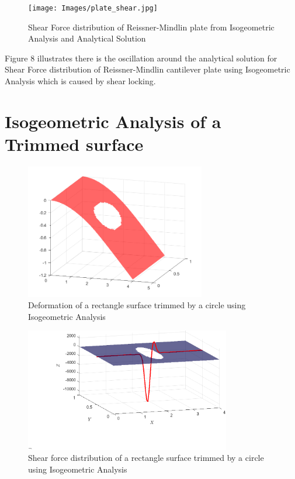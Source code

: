 \documentclass[12pt, a4paper]{report}
\begin{document}
\begin{figure}[H]
\centering
\texttt{[image: Images/plate\_shear.jpg]}
\caption{Shear Force distribution of Reissner-Mindlin plate from Isogeometric Analysis and Analytical Solution}
\label{fig:RM}
\end{figure}

Figure 8 illustrates there is the oscillation around the analytical solution for Shear Force distribution of Reissner-Mindlin cantilever plate using Isogeometric Analysis which is caused by shear locking.
\section{Isogeometric Analysis of a Trimmed surface}

\begin{figure}[htbp]
\centering
\includegraphics[width=0.7\textwidth]{Images/trim_plate_deform.png}
\caption{Deformation of a rectangle surface trimmed by a circle using Isogeometric Analysis}
\label{fig:Tridef}
\end{figure}

\begin{figure}[H]
\centering
\includegraphics[width=0.8\textwidth]{Images/trim_shear.png}
\caption{Shear force distribution of a rectangle surface trimmed by a circle using Isogeometric Analysis}
\label{fig:TriShear}
\end{figure}
\clearpage
\end{document}
